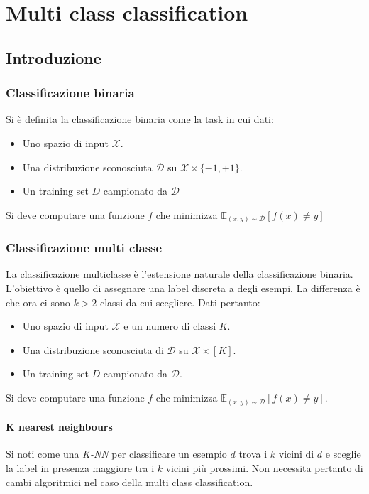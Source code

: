 \chapter{Multi class classification}

\section{Introduzione}

	\subsection{Classificazione binaria}
	Si \`e definita la classificazione binaria come la task in cui dati:
	\begin{itemize}
		\item Uno spazio di input $\mathcal{X}$.
		\item Una distribuzione sconosciuta $\mathcal{D}$ su $\mathcal{X}\times\{-1,+1\}$.
		\item Un training set $D$ campionato da $\mathcal{D}$
	\end{itemize}
	Si deve computare una funzione $f$ che minimizza $\mathbb{E}_{(x,y)\sim\mathcal{D}}[f(x)\neq y]$
	
	\subsection{Classificazione multi classe}
	La classificazione multiclasse \`e l'estensione naturale della classificazione binaria.
	L'obiettivo \`e quello di assegnare una label discreta a degli esempi.
	La differenza \`e che ora ci sono $k>2$ classi da cui scegliere.
	Dati pertanto:
	\begin{itemize}
		\item Uno spazio di input $\mathcal{X}$ e un numero di classi $K$.
		\item Una distribuzione sconosciuta di $\mathcal{D}$ su $\mathcal{X}\times[K]$.
		\item Un training set $D$ campionato da $\mathcal{D}$.
	\end{itemize}
	Si deve computare una funzione $f$ che minimizza $\mathbb{E}_{(x,y)\sim\mathcal{D}}[f(x)\neq y]$.
	
		\subsubsection{K nearest neighbours}
		Si noti come una \emph{K-NN} per classificare un esempio $d$ trova i $k$ vicini di $d$ e sceglie la label in presenza maggiore tra i $k$ vicini pi\`u prossimi.
		Non necessita pertanto di cambi algoritmici nel caso della multi class classification.
		
